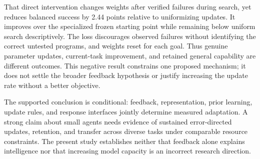 \documentclass[11pt]{article}
\begin{document}
That direct intervention changes weights after verified failures during
search, yet reduces balanced success by 2.44 points relative to uniformizing
updates. It improves over the specialized frozen starting point while
remaining below uniform search descriptively. The loss discourages observed
failures without identifying the correct untested programs, and weights reset
for each goal. Thus genuine parameter updates, current-task improvement, and
retained general capability are different outcomes. This negative result
constrains one proposed mechanism; it does not settle the broader feedback
hypothesis or justify increasing the update rate without a better objective.

The supported conclusion is conditional: feedback, representation, prior
learning, update rules, and response interfaces jointly determine measured
adaptation. A strong claim about small agents needs evidence of sustained
error-directed updates, retention, and transfer across diverse tasks under
comparable resource constraints. The present study establishes neither that
feedback alone explains intelligence nor that increasing model capacity is an
incorrect research direction.
\end{document}
